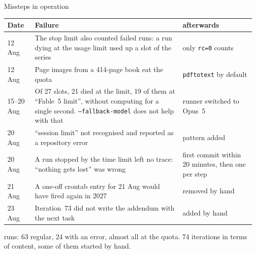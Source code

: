 \documentclass[11pt,aspectratio=169]{beamer}
\begin{document}
\begin{frame}{Missteps in operation}
  \scriptsize
  \begin{tabular}{@{}lp{}p{}@{}}
    \toprule
    Date & Failure & afterwards \\
    \midrule
    12 Aug & The stop limit also counted failed runs: a run dying at the usage limit
              used up a slot of the series & only \texttt{rc=0} counts \\
    12 Aug & Page images from a 414-page book eat the quota &
              \texttt{pdftotext} by default \\
    15--20 Aug & Of 27 slots, 21 died at the limit, 19 of them at \enquote{Fable~5 limit},
              without computing for a single second. \texttt{--fallback-model} does not
              help with that & runner switched to Opus~5 \\
    20 Aug & \enquote{session limit} not recognised and reported as a repository error &
              pattern added \\
    20 Aug & A run stopped by the time limit left no trace: \enquote{nothing gets lost}
              was wrong & first commit within 20 minutes, then one per step \\
    21 Aug & A one-off crontab entry for 21 Aug would have fired again in 2027 &
              removed by hand \\
    23 Aug & Iteration~73 did not write the addendum with the next task & added by
              hand \\
    \bottomrule
  \end{tabular}

   runs: 63 regular, 24 with an error, almost all at the quota.
  74 iterations in terms of content, some of them started by hand.
\end{frame}
\end{document}
